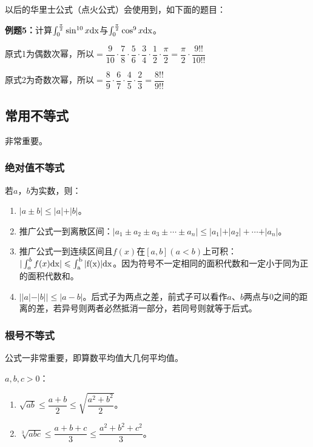 \documentclass[UTF8, 12pt]{ctexart}
\begin{document}
以后的华里士公式（点火公式）会使用到，如下面的题目：

\textbf{例题5：}计算$\int_0^{\frac{\pi}{2}}\sin^{10}x\rm{d}x$与$\int_0^{\frac{\pi}{2}}\cos^9x\rm{d}x$。

原式1为偶数次幂，所以$=\dfrac{9}{10}\cdot\dfrac{7}{8}\cdot\dfrac{5}{6}\cdot\dfrac{3}{4}\cdot\dfrac{1}{2}\cdot\dfrac{\pi}{2}=\dfrac{\pi}{2}\cdot\dfrac{9!!}{10!!}$

原式2为奇数次幂，所以$=\dfrac{8}{9}\cdot\dfrac{6}{7}\cdot\dfrac{4}{5}\cdot\dfrac{2}{3}=\dfrac{8!!}{9!!}$

\subsection{常用不等式}

非常重要。

\subsubsection{绝对值不等式}

若$a$，$b$为实数，则：

\begin{enumerate}
    \item $\vert a\pm b\vert\leqslant\vert a\vert+\vert b\vert$。
    \item 推广公式一到离散区间：$\vert a_1\pm a_2\pm a_3\pm\cdots\pm a_n\vert\leqslant\vert a_1\vert+\vert a_2\vert+\cdots+\vert a_n\vert$。
    \item 推广公式一到连续区间且$f(x)$在$[a,b](a<b)$上可积：$\vert\int_a^bf(x)\rm{d}x\vert\leqslant\int_a^b\vert f(x)\vert\rm{d}x$。因为符号不一定相同的面积代数和一定小于同为正的面积代数和。
    \item $\vert\vert a\vert-\vert b\vert\vert\leqslant\vert a-b\vert$。后式子为两点之差，前式子可以看作$a$、$b$两点与0之间的距离的差，若异号则两者必然抵消一部分，若同号则就等于后式。
\end{enumerate}



\subsubsection{根号不等式}

公式一非常重要，即算数平均值大几何平均值。

$a,b,c>0$：

\begin{enumerate}
    \item $\sqrt{ab}\leqslant\dfrac{a+b}{2}\leqslant\sqrt{\dfrac{a^2+b^2}{2}}$。
    \item $\sqrt[3]{abc}\leqslant\dfrac{a+b+c}{3}\leqslant\dfrac{a^2+b^2+c^2}{3}$。
\end{enumerate}
\end{document}
